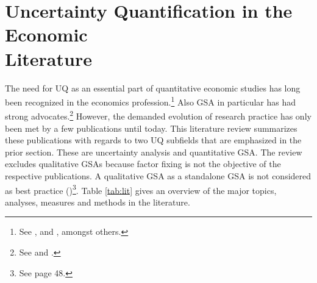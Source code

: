 \section{Uncertainty Quantification in the Economic \\ Literature}
\thispagestyle{plain} %

The need for UQ as an essential part of quantitative economic studies has long been recognized in the economics profession.\footnote{See \cite{Hansen.1996}, \cite{Kydland.1992} and \cite{Canova.1994}, amongst others.} Also GSA in particular has had strong advocates.\footnote{See \cite{Canova.1995} and \cite{Gregory.1995}.} However, the demanded evolution of research practice has only been met by a few publications until today. This literature review summarizes these publications with regards to two UQ subfields that are emphasized in the prior section. These are uncertainty analysis and quantitative GSA. The review excludes qualitative GSAs because factor fixing is not the objective of the respective publications. A qualitative GSA as a standalone GSA is not considered as best practice (\cite{Saltelli.2004})\footnote{See page 48.}. Table \ref{tab:lit} gives an overview of the major topics, analyses, measures and methods in the literature.\\

